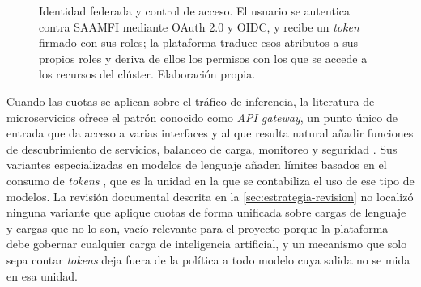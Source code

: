 \begin{figure}[H]
  \centering
  \caption[Identidad federada y control de acceso]{Identidad federada y control de acceso. El usuario se autentica contra SAAMFI mediante OAuth 2.0 y OIDC, y recibe un \emph{token} firmado con sus roles; la plataforma traduce esos atributos a sus propios roles y deriva de ellos los permisos con los que se accede a los recursos del clúster. Elaboración propia.}
  \label{fig:identidad-federada}
\end{figure}

Cuando las cuotas se aplican sobre el tráfico de inferencia, la literatura de microservicios ofrece el patrón conocido como \emph{API gateway}, un punto único de entrada que da acceso a varias interfaces y al que resulta natural añadir funciones de descubrimiento de servicios, balanceo de carga, monitoreo y seguridad \citep{montesi-apigatewaypatterns-2016}. Sus variantes especializadas en modelos de lenguaje añaden límites basados en el consumo de \emph{tokens} \citep{litellm-proxyusers-2026}, que es la unidad en la que se contabiliza el uso de ese tipo de modelos. La revisión documental descrita en la \cref{sec:estrategia-revision} no localizó ninguna variante que aplique cuotas de forma unificada sobre cargas de lenguaje y cargas que no lo son, vacío relevante para el proyecto porque la plataforma debe gobernar cualquier carga de inteligencia artificial, y un mecanismo que solo sepa contar \emph{tokens} deja fuera de la política a todo modelo cuya salida no se mida en esa unidad.

